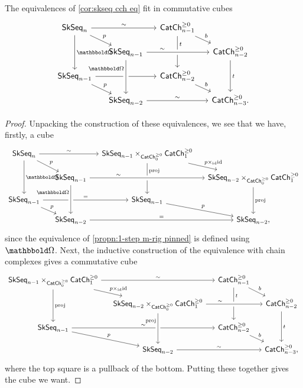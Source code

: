 \documentclass[a4paper,11pt]{article}
\begin{document}
\begin{propn}\label{propn:omega top cube}
  The equivalences of \cref{cor:skseq cch eq} fit in commutative
  cubes
  \[
    \begin{tikzcd}[row sep=small,column sep=small]
      \SkSeq_{n} \ar[rr, "\sim"] \ar[dr, "p"] \ar[dd, "\mOm"] & &
      \CChp_{n-1} \ar[dr, "b"] \ar[dd, "t"{near start}] \\
      & \SkSeq_{n-1} \ar[rr,crossing over, "\sim"{near start}]  & & \CChp_{n-2}
      \ar[dd, "t"] \\
      \SkSeq_{n-1} \ar[rr, "\sim"] \ar[dr, "p"] & & \CChp_{n-2} \ar[dr, "b"] \\
      &  \SkSeq_{n-2} \ar[rr, "\sim"] \ar[uu,leftarrow,crossing over,
      "\mOm"{near end}]  & & \CChp_{n-3}.
    \end{tikzcd}
  \]
\end{propn}
\begin{proof}
  Unpacking the construction of these equivalences, we see that we
  have, firstly, a cube
  \[
    \begin{tikzcd}[row sep=small,column sep=small]
      \SkSeq_{n} \ar[rr, "\sim"] \ar[dr, "p"] \ar[dd, "\mOm"] & &
      \SkSeq_{n-1} \times_{\CChp_{0}} \CChp_{1} \ar[dr, "p
      \times_{\id} \id"] \ar[dd, "\text{proj}"{near start}] \\
      & \SkSeq_{n-1} \ar[rr,crossing over, "\sim"{near start}]  & &
      \SkSeq_{n-2} \times_{\CChp_{0}} \CChp_{1}
      \ar[dd, "\text{proj}"] \\
      \SkSeq_{n-1} \ar[rr, "="] \ar[dr, "p"] & & \SkSeq_{n-1} \ar[dr, "p"] \\
      &  \SkSeq_{n-2} \ar[rr, "="] \ar[uu,leftarrow,crossing over,
      "\mOm"{near end}]  & & \SkSeq_{n-2},
    \end{tikzcd}
  \]
  since the equivalence of \cref{propn:1-step m-rig pinned} is defined using
  $\mOm$. Next, the inductive construction of the equivalence with
  chain complexes gives a commutative cube
    \[
    \begin{tikzcd}[row sep=small,column sep=small]
      \SkSeq_{n-1} \times_{\CChp_{0}} \CChp_{1} \ar[rr, "\sim"]
      \ar[dr, "p \times_{\id}\id"] \ar[dd, "\text{proj}"] & &
      \CChp_{n-1} \ar[dr, "b"] \ar[dd, "t"{near start}] \\
      & \SkSeq_{n-2} \times_{\CChp_{0}} \CChp_{1} \ar[rr,crossing over, "\sim"{near start}]  & & \CChp_{n-2}
      \ar[dd, "t"] \\
      \SkSeq_{n-1} \ar[rr, "\sim"] \ar[dr, "p"] & & \CChp_{n-2} \ar[dr, "b"] \\
      &  \SkSeq_{n-2} \ar[rr, "\sim"] \ar[uu,leftarrow,crossing over,
      "\text{proj}"{near end}]  & & \CChp_{n-3},
    \end{tikzcd}
  \]
  where the top square is a pullback of the bottom. Putting these
  together gives the cube we want.
\end{proof}
\end{document}
